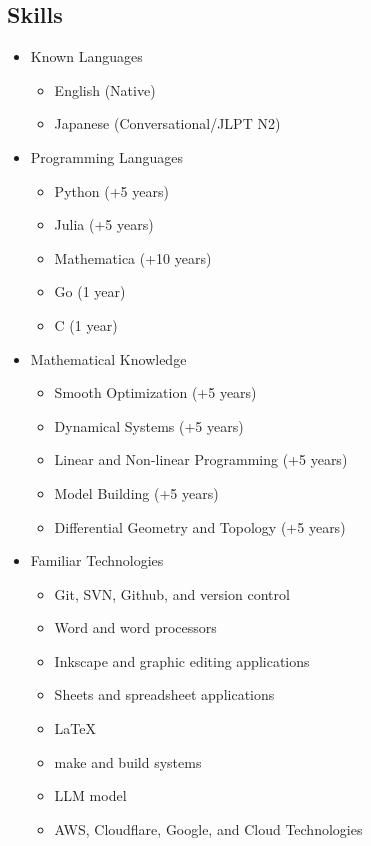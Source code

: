 \subsection{Skills}

\begin{itemize}
  \item Known Languages
    \begin{itemize}
      \item English (Native)
      \item Japanese (Conversational/JLPT N2)
    \end{itemize}
  \item Programming Languages
    \begin{itemize}
      \item Python (+5 years)
      \item Julia (+5 years)
      \item Mathematica (+10 years)
      \item Go (1 year)
      \item C (1 year)
    \end{itemize}
  \item Mathematical Knowledge
    \begin{itemize}
      \item Smooth Optimization (+5 years)
      \item Dynamical Systems (+5 years)
      \item Linear and Non-linear Programming (+5 years)
      \item Model Building (+5 years)
      \item Differential Geometry and Topology (+5 years)
    \end{itemize}
  \item Familiar Technologies
    \begin{itemize}
      \item Git, SVN, Github, and version control
      \item Word and word processors
      \item Inkscape and graphic editing applications
      \item Sheets and spreadsheet applications
      \item LaTeX
      \item make and build systems
      \item LLM model
      \item AWS, Cloudflare, Google, and Cloud Technologies
    \end{itemize}
\end{itemize}

